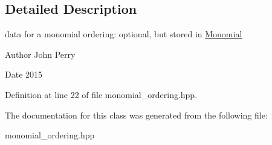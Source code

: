 \subsection{Detailed Description}
data for a monomial ordering\+: optional, but stored in {\ttfamily \hyperlink{class_monomial}{Monomial}} 

\begin{DoxyAuthor}{Author}
John Perry 
\end{DoxyAuthor}
\begin{DoxyDate}{Date}
2015 
\end{DoxyDate}


Definition at line 22 of file monomial\+\_\+ordering.\+hpp.



The documentation for this class was generated from the following file\+:\begin{DoxyCompactItemize}
\item 
monomial\+\_\+ordering.\+hpp\end{DoxyCompactItemize}
